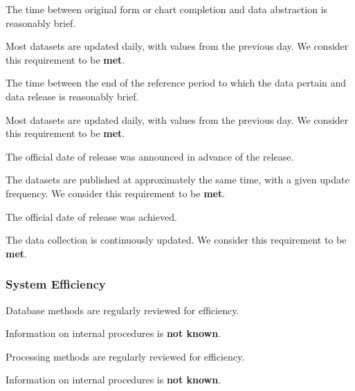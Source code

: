 \begin{QandA}
    \item The time between original form or chart completion and data abstraction is reasonably brief.
    \begin{answered}
        Most datasets are updated daily, with values from the previous day.
        We consider this requirement to be \textbf{met}.
    \end{answered}

    \item The time between the end of the reference period to which the data pertain and data release is reasonably brief.
    \begin{answered}
        Most datasets are updated daily, with values from the previous day.
        We consider this requirement to be \textbf{met}.
    \end{answered}

    \item The official date of release was announced in advance of the release.
    \begin{answered}
        The datasets are published at approximately the same time, with a given update frequency.
        We consider this requirement to be \textbf{met}.
    \end{answered}

    \item The official date of release was achieved.
    \begin{answered}
        The data collection is continuously updated.
        We consider this requirement to be \textbf{met}.
    \end{answered}

\end{QandA}

\subsubsection{System Efficiency}

\begin{QandA}
    \item Database methods are regularly reviewed for efficiency.
    \begin{answered}
        Information on internal procedures is \textbf{not known}.
    \end{answered}

    \item Processing methods are regularly reviewed for efficiency.
    \begin{answered}
        Information on internal procedures is \textbf{not known}.
    \end{answered}

\end{QandA}

